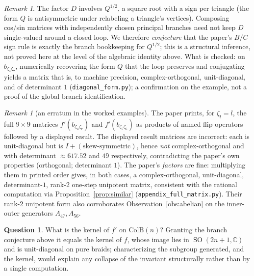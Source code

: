 \documentclass[11pt]{article}
\theoremstyle{plain}
\theoremstyle{definition}
\newtheorem{question}[theorem]{Question}
\theoremstyle{remark}
\newtheorem{remark}[theorem]{Remark}
\newcommand{\C}{\mathbb{C}}
\DeclareMathOperator{\SO}{SO}
\begin{document}
\begin{remark}
The factor $D$ involves $Q^{1/2}$, a square root with a sign per triangle (the form $Q$ is
antisymmetric under relabeling a triangle's vertices). Composing cos/sin matrices with independently
chosen principal branches need not keep $D$ single-valued around a closed loop. We therefore
\emph{conjecture} that the paper's $B/C$ sign rule is exactly the branch bookkeeping for $Q^{1/2}$;
this is a structural inference, not proved here at the level of the algebraic identity above. What is
checked: on $b_{\zeta_4\zeta_7}$, numerically recovering the form $Q$ that the loop preserves and
conjugating yields a matrix that is, to machine precision, complex-orthogonal, unit-diagonal, and of
determinant $1$ (\texttt{diagonal\_form.py}); a confirmation on the example, not a proof of the
global branch identification.
\end{remark}

\begin{remark}[an erratum in the worked examples]
The paper prints, for $\zeta_l=l$, the full $9\times9$ matrices $f'(b_{\zeta_4\zeta_7})$ and
$f'(b_{\zeta_5\zeta_6})$ as products of named flip operators followed by a displayed result. The
displayed result matrices are incorrect: each is unit-diagonal but is $I+(\text{skew-symmetric})$,
hence \emph{not} complex-orthogonal and with determinant $\approx 617.52$ and $49$ respectively, contradicting
the paper's own properties (orthogonal; determinant $1$). The paper's \emph{factors} are fine:
multiplying them in printed order gives, in both cases, a complex-orthogonal, unit-diagonal,
determinant-$1$, rank-$2$ one-step unipotent matrix, consistent with the rational computation via
Proposition~\ref{prop:similar} (\texttt{appendix\_full\_matrix.py}). Their rank-$2$ unipotent form also
corroborates Observation~\ref{obs:abelian} on the inner-outer generators $A_{47},A_{56}$.
\end{remark}

\begin{question}
What is the kernel of $f'$ on $\mathrm{ColB}(n)$? Granting the branch conjecture above it equals the
kernel of $f$, whose image lies in $\SO(2n+1,\C)$ and is unit-diagonal on pure braids; characterizing
the subgroup generated, and the kernel, would explain any collapse of the invariant structurally
rather than by a single computation.
\end{question}
\end{document}
